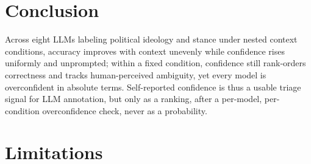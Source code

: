 \documentclass[11pt]{article}
\begin{document}
\section{Conclusion}

Across eight LLMs labeling political ideology and stance under nested context conditions, accuracy improves with context unevenly while confidence rises uniformly and unprompted; within a fixed condition, confidence still rank-orders correctness and tracks human-perceived ambiguity, yet every model is overconfident in absolute terms. Self-reported confidence is thus a usable triage signal for LLM annotation, but only as a ranking, after a per-model, per-condition overconfidence check, never as a probability.

\section*{Limitations}
\end{document}
